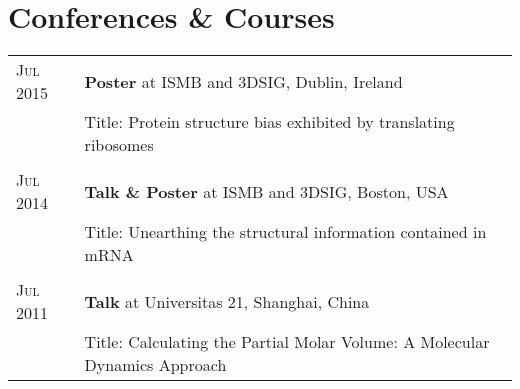 \section{Conferences \& Courses}
\begin{tabular}{>{\raggedleft}p{2.15cm}|p{12cm}}

  \textsc{Jul 2015} &  \textbf{Poster} at ISMB and 3DSIG, Dublin, Ireland \\
 & Title: Protein structure bias exhibited by translating ribosomes\\

\multicolumn{2}{c}{}\\

  \textsc{Jul 2014} &  \textbf{Talk \& Poster} at ISMB and 3DSIG, Boston, USA \\
 & Title: Unearthing the structural information contained in mRNA\\



\multicolumn{2}{c}{}\\
 \textsc{Jul 2011} &  \textbf{Talk} at Universitas 21, Shanghai, China \\
 & Title: Calculating the Partial Molar Volume: A Molecular Dynamics Approach\\

\end{tabular}
